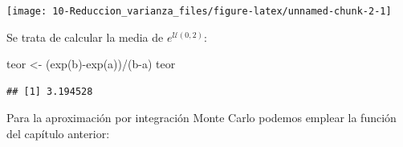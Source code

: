 \documentclass[
]{book}
\newenvironment{Shaded}{\begin{snugshade}}{\end{snugshade}}
\newcommand{\FunctionTok}[1]{\textcolor[rgb]{0.00,0.00,0.00}{#1}}
\newcommand{\NormalTok}[1]{#1}
\newcommand{\OtherTok}[1]{\textcolor[rgb]{0.56,0.35,0.01}{#1}}
\newcommand{\SpecialCharTok}[1]{\textcolor[rgb]{0.00,0.00,0.00}{#1}}
\theoremstyle{break}
\theoremstyle{definition}
\theoremstyle{definition}
\theoremstyle{definition}
\theoremstyle{definition}
\theoremstyle{remark}
\begin{document}
\begin{center}\texttt{[image: 10-Reduccion\_varianza\_files/figure-latex/unnamed-chunk-2-1]} \end{center}

Se trata de calcular la media de \(e^{\mathcal{U}(0,2)}\):

\begin{Shaded}
\begin{Highlighting}[]
\NormalTok{teor }\OtherTok{\textless{}{-}}\NormalTok{ (}\FunctionTok{exp}\NormalTok{(b)}\SpecialCharTok{{-}}\FunctionTok{exp}\NormalTok{(a))}\SpecialCharTok{/}\NormalTok{(b}\SpecialCharTok{{-}}\NormalTok{a)}
\NormalTok{teor}
\end{Highlighting}
\end{Shaded}

\begin{verbatim}
## [1] 3.194528
\end{verbatim}

Para la aproximación por integración Monte Carlo podemos emplear la función del capítulo anterior:
\end{document}
